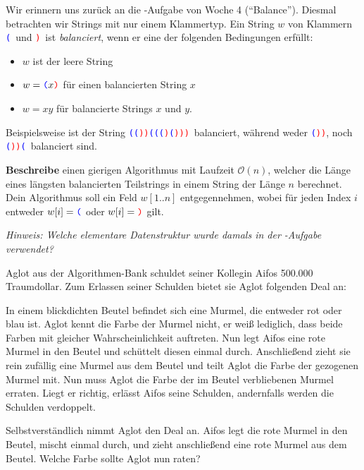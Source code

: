 \documentclass{uebung_cs}
\begin{document}
\begin{aufgabe}[Balance II]
    \newcommand{\obr}{\textcolor{blue}{\texttt (}}
    \newcommand{\cbr}{\textcolor{red}{\texttt )}}
    Wir erinnern uns zurück an die -Aufgabe von Woche 4 (``Balance'').
    Diesmal betrachten wir Strings mit nur einem Klammertyp.
    Ein String $w$ von Klammern \obr\ und \cbr\ ist \emph{balanciert}, wenn er eine der folgenden Bedingungen erfüllt:
    \begin{itemize}
        \item $w$ ist der leere String
        \item $w = \obr x \cbr$ für einen balancierten String $x$
        \item $w = xy$ für balancierte Strings $x$ und $y$.
    \end{itemize}
    Beispielsweise ist der String \obr \obr \cbr \cbr \obr \obr \obr \cbr \obr \cbr \cbr \cbr\ balanciert, während weder \obr \cbr \cbr, noch \obr \cbr \cbr \obr\ balanciert sind.

    \textbf{Beschreibe} einen gierigen Algorithmus mit Laufzeit $\mathcal O(n)$, welcher die Länge eines längsten balancierten Teilstrings in einem String der Länge $n$ berechnet.
    Dein Algorithmus soll ein Feld $w[1..n]$ entgegennehmen, wobei für jeden Index $i$ entweder $w[i] = \obr$ oder $w[i] = \cbr$ gilt.

    \emph{Hinweis: Welche elementare Datenstruktur wurde damals in der -Aufgabe verwendet?}
\end{aufgabe}

\begin{aufgabe}[Schuldenerlass]
    Aglot aus der Algorithmen-Bank schuldet seiner Kollegin Aifos 500.000 Traumdollar. Zum Erlassen seiner Schulden bietet sie Aglot folgenden Deal an:

    In einem blickdichten Beutel befindet sich eine Murmel, die entweder rot oder blau ist.
    Aglot kennt die Farbe der Murmel nicht, er weiß lediglich, dass beide Farben mit gleicher Wahrscheinlichkeit auftreten.
    Nun legt Aifos eine rote Murmel in den Beutel und schüttelt diesen einmal durch.
    Anschließend zieht sie rein zufällig eine Murmel aus dem Beutel und teilt Aglot die Farbe der gezogenen Murmel mit.
    Nun muss Aglot die Farbe der im Beutel verbliebenen Murmel erraten.
    Liegt er richtig, erlässt Aifos seine Schulden, andernfalls werden die Schulden verdoppelt.

    Selbstverständlich nimmt Aglot den Deal an.
    Aifos legt die rote Murmel in den Beutel, mischt einmal durch, und zieht anschließend eine rote Murmel aus dem Beutel.
    Welche Farbe sollte Aglot nun raten?
\end{aufgabe}
\end{document}
